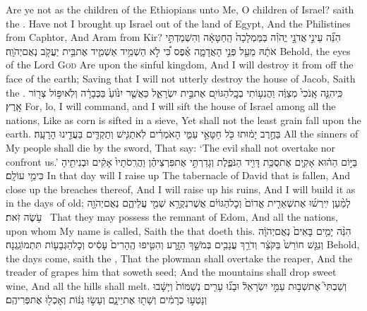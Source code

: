 {Are ye not as the children of the Ethiopians unto Me, O children of Israel? saith the \lord. Have not I brought up Israel out of the land of Egypt, And the Philistines from Caphtor, And Aram from Kir?}
{הִנֵּ֞ה עֵינֵ֣י \legarmeh  אֲדֹנָ֣י יֱהֹוִ֗ה בַּמַּמְלָכָה֙ הַֽחַטָּאָ֔ה וְהִשְׁמַדְתִּ֣י אֹתָ֔הּ מֵעַ֖ל פְּנֵ֣י הָאֲדָמָ֑ה אֶ֗פֶס כִּ֠י לֹ֣א הַשְׁמֵ֥יד אַשְׁמִ֛יד אֶת\maqqaf בֵּ֥ית יַעֲקֹ֖ב נְאֻם\maqqaf יְהֹוָֽה׃}
{Behold, the eyes of the Lord \textsc{God} Are upon the sinful kingdom, And I will destroy it from off the face of the earth; Saving that I will not utterly destroy the house of Jacob, Saith the \lord.}
{כִּֽי\maqqaf הִנֵּ֤ה אָֽנֹכִי֙ מְצַוֶּ֔ה וַהֲנִע֥וֹתִי בְכׇֽל\maqqaf הַגּוֹיִ֖ם אֶת\maqqaf בֵּ֣ית יִשְׂרָאֵ֑ל כַּאֲשֶׁ֤ר יִנּ֙וֹעַ֙ בַּכְּבָרָ֔ה וְלֹֽא\maqqaf יִפּ֥וֹל צְר֖וֹר אָֽרֶץ׃}
{For, lo, I will command, and I will sift the house of Israel among all the nations, Like as corn is sifted in a sieve, Yet shall not the least grain fall upon the earth.}
{בַּחֶ֣רֶב יָמ֔וּתוּ כֹּ֖ל חַטָּאֵ֣י עַמִּ֑י הָאֹמְרִ֗ים לֹֽא\maqqaf תַגִּ֧ישׁ וְתַקְדִּ֛ים בַּעֲדֵ֖ינוּ הָרָעָֽה׃}
{All the sinners of My people shall die by the sword, That say: ‘The evil shall not overtake nor confront us.’}
{בַּיּ֣וֹם הַה֔וּא אָקִ֛ים אֶת\maqqaf סֻכַּ֥ת דָּוִ֖יד הַנֹּפֶ֑לֶת וְגָדַרְתִּ֣י אֶת\maqqaf פִּרְצֵיהֶ֗ן וַהֲרִֽסֹתָיו֙ אָקִ֔ים וּבְנִיתִ֖יהָ כִּימֵ֥י עוֹלָֽם׃}
{In that day will I raise up The tabernacle of David that is fallen, And close up the breaches thereof, And I will raise up his ruins, And I will build it as in the days of old;}
{לְמַ֨עַן יִֽירְשׁ֜וּ אֶת\maqqaf שְׁאֵרִ֤ית אֱדוֹם֙ וְכׇל\maqqaf הַגּוֹיִ֔ם אֲשֶׁר\maqqaf נִקְרָ֥א שְׁמִ֖י עֲלֵיהֶ֑ם נְאֻם\maqqaf יְהֹוָ֖ה עֹ֥שֶׂה זֹּֽאת׃ \petucha }
{That they may possess the remnant of Edom, And all the nations, upon whom My name is called, Saith the \lord\space that doeth this.}
{הִנֵּ֨ה יָמִ֤ים בָּאִים֙ נְאֻם\maqqaf יְהֹוָ֔ה וְנִגַּ֤שׁ חוֹרֵשׁ֙ בַּקֹּצֵ֔ר וְדֹרֵ֥ךְ עֲנָבִ֖ים בְּמֹשֵׁ֣ךְ הַזָּ֑רַע וְהִטִּ֤יפוּ הֶֽהָרִים֙ עָסִ֔יס וְכׇל\maqqaf הַגְּבָע֖וֹת תִּתְמוֹגַֽגְנָה׃}
{Behold, the days come, saith the \lord, That the plowman shall overtake the reaper, And the treader of grapes him that soweth seed; And the mountains shall drop sweet wine, And all the hills shall melt.}
{וְשַׁבְתִּי֮ אֶת\maqqaf שְׁב֣וּת עַמִּ֣י יִשְׂרָאֵל֒ וּבָנ֞וּ עָרִ֤ים נְשַׁמּוֹת֙ וְיָשָׁ֔בוּ וְנָטְע֣וּ כְרָמִ֔ים וְשָׁת֖וּ אֶת\maqqaf יֵינָ֑ם וְעָשׂ֣וּ גַנּ֔וֹת וְאָכְל֖וּ אֶת\maqqaf פְּרִיהֶֽם׃}
